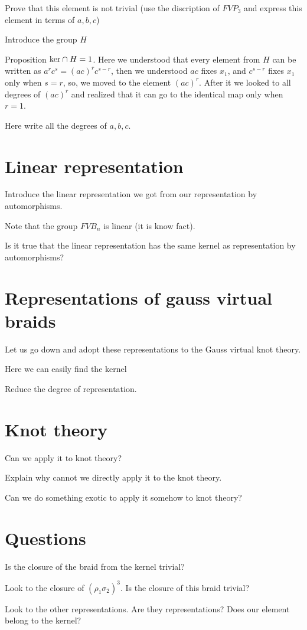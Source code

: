 \documentclass{article}
\begin{document}
Prove that this element is not trivial (use the discription of $FVP_3$ and express this element in terms of $a,b,c$)

Introduce the group $H$

Proposition ${\rm ker}\cap H=1$. Here we understood that every element from $H$ can be written as $a^rc^s=(ac)^rc^{s-r}$, then we understood $ac$ fixes $x_1$, and $c^{s-r}$ fixes $x_1$ only when $s=r$, so, we moved to the element $(ac)^r$. After it we looked to all degrees of $(ac)^r$ and realized that it can go to the identical map only when $r=1$. 

Here write all the degrees of $a,b,c$.
\section{Linear representation}
Introduce the linear representation we got from our representation by automorphisms.

Note that the group $FVB_n$ is linear (it is know fact).

Is it true that the linear representation has the same kernel as representation by automorphisms?

\section{Representations of gauss virtual braids}
Let us go down and adopt these representations to the Gauss virtual knot theory.

Here we can easily find the kernel

Reduce the degree of representation.
\section{Knot theory}
Can we apply it to knot theory?

Explain why cannot we directly apply it to the knot theory.

Can we do something exotic to apply it somehow to knot theory?

\section{Questions}
Is the closure of the braid from the kernel trivial?

Look to the closure of $(\rho_1\sigma_2)^3$. Is the closure of this braid trivial?

Look to the other representations. Are they representations? Does our element belong to the kernel?
\end{document}
